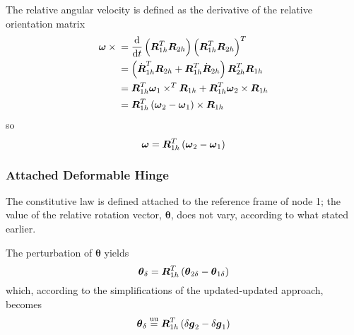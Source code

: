 \documentclass[10pt,dvips,fleqn,subeqn]{report}
\newcommand{\T}[1]{\boldsymbol{#1}}
\newcommand{\equu}{\overset{\text{uu}}{=}}
\begin{document}
The relative angular velocity is defined as the derivative
of the relative orientation matrix
\begin{align}
	\T{\omega}\times{}
	&= \frac{\mathrm{d}}{\mathrm{d}t} \plbr{
		\T{R}_{1h}^T \T{R}_{2h}
	} \plbr{
		\T{R}_{1h}^T \T{R}_{2h}
	}^T \\
	&= \plbr{
		\dot{\T{R}}_{1h}^T \T{R}_{2h}
		+ \T{R}_{1h}^T \dot{\T{R}}_{2h}
	} \T{R}_{2h}^T \T{R}_{1h} \\
	&= \T{R}_{1h}^T \T{\omega}_1 \times^T \T{R}_{1h}
	+ \T{R}_{1h}^T \T{\omega}_2 \times \T{R}_{1h} \\
	&= \T{R}_{1h}^T \plbr{
		\T{\omega}_2 - \T{\omega}_1
	}\times \T{R}_{1h}
\end{align}
so
\begin{equation}
	\T{\omega} = \T{R}_{1h}^T \plbr{
		\T{\omega}_2 - \T{\omega}_1
	}
	\label{eq:deformable-hinge-attached-omega}
\end{equation}



\subsubsection{Attached Deformable Hinge}
The constitutive law is defined attached to the reference frame of node 1;
the value of the relative rotation vector, $\T{\theta}$, does not vary,
according to what stated earlier.

The perturbation of $\T{\theta}$ yields
\begin{equation}
	\T{\theta}_{\delta} = \T{R}_{1h}^T\plbr{\T{\theta}_{2\delta} - \T{\theta}_{1\delta}}
	\label{eq:def-h-theta-delta}
\end{equation}
which, according to the simplifications of the updated-updated approach, becomes
\begin{equation}
	\T{\theta}_{\delta} \equu \T{R}_{1h}^T\plbr{\delta\T{g}_2 - \delta\T{g}_1}
\end{equation}
\end{document}
